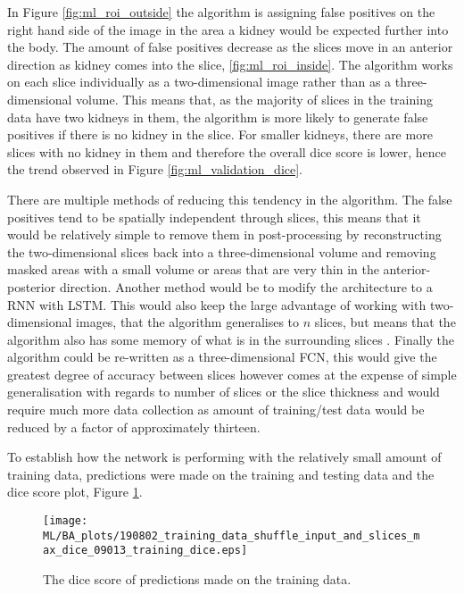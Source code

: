 In Figure \ref{fig:ml_roi_outside} the algorithm is assigning false positives on the right hand side of the image in the area a kidney would be expected further into the body. The amount of false positives decrease as the slices move in an anterior direction as kidney comes into the slice, \ref{fig:ml_roi_inside}. The algorithm works on each slice individually as a two-dimensional image rather than as a three-dimensional volume. This means that, as the majority of slices in the training data have two kidneys in them, the algorithm is more likely to generate false positives if there is no kidney in the slice. For smaller kidneys, there are more slices with no kidney in them and therefore the overall dice score is lower, hence the trend observed in Figure \ref{fig:ml_validation_dice}.

There are multiple methods of reducing this tendency in the algorithm. The false positives tend to be spatially independent through slices, this means that it would be relatively simple to remove them in post-processing by reconstructing the two-dimensional slices back into a three-dimensional volume and removing masked areas with a small volume or areas that are very thin in the anterior-posterior direction. Another method would be to modify the architecture to a \ac{RNN} with \ac{LSTM}. This would also keep the large advantage of working with two-dimensional images, that the algorithm generalises to $n$ slices, but means that the algorithm also has some memory of what is in the surrounding slices \cite{chen_combining_2016, stollenga_parallel_2015}. Finally the algorithm could be re-written as a three-dimensional \ac{FCN}, this would give the greatest degree of accuracy between slices however comes at the expense of simple generalisation with regards to number of slices or the slice thickness and would require much more data collection as amount of training/test data would be reduced by a factor of approximately thirteen.

To establish how the network is performing with the relatively small amount of training data, predictions were made on the training and testing data and the dice score plot, Figure \ref{fig:ml_training_dice}.

\begin{figure}[H]
	\centering
	\texttt{[image: ML/BA\_plots/190802\_training\_data\_shuffle\_input\_and\_slices\_max\_dice\_09013\_training\_dice.eps]}
	\caption{The dice score of predictions made on the training data.}
	\label{fig:ml_training_dice}
\end{figure}


